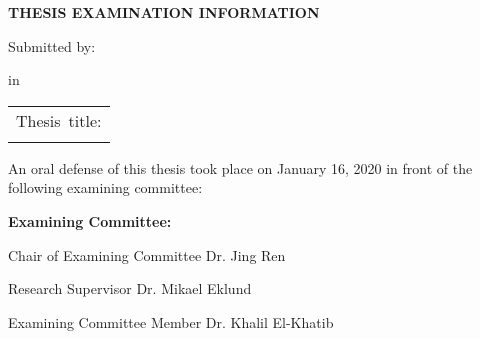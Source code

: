 
\begin{center}
	
{\textbf{THESIS EXAMINATION INFORMATION}}

\vspace{0.1cm}
{Submitted by: \textbf{\authorname}}

\vspace{\baselineskip}
{\textbf{\degreename} in \textbf{\subjectname}}

\vspace{0.1cm}

\end{center}


\begin{table}[H]
	\centering
	\begin{tabular}{p{6in}}
		\hline
		\multicolumn{1}{|p{5.5in}|}{{Thesis\ title: \textbf{\ttitle}}} \\
		\hhline{-}
	\end{tabular}
\end{table}


\vspace{0.1cm}
\noindent
{An oral defense of this thesis took place on January 16, 2020 in front of the following examining committee:}

\vspace{\baselineskip}
\noindent
{\textbf{Examining Committee:}}
\vspace{\baselineskip}

\vspace{0.2cm}
{\setlength{\parindent}{0cm}Chair of Examining Committee \tab Dr. Jing Ren}

\vspace{0.2cm}
{\setlength{\parindent}{0cm}Research Supervisor \tab Dr. Mikael Eklund}

\vspace{0.2cm}
{\setlength{\parindent}{0cm}Examining Committee Member \tab Dr. Khalil El-Khatib}


